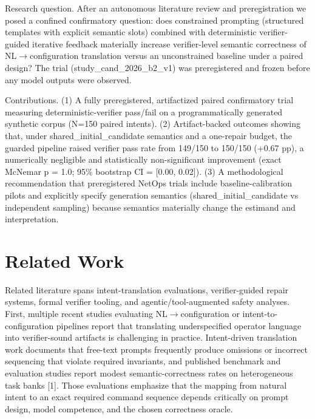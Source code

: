 \documentclass[conference]{IEEEtran}
\begin{document}
Research question. After an autonomous literature review and preregistration we posed a confined confirmatory question: does constrained prompting (structured templates with explicit semantic slots) combined with deterministic verifier-guided iterative feedback materially increase verifier-level semantic correctness of NL\ensuremath{\rightarrow}configuration translation versus an unconstrained baseline under a paired design? The trial (study\_cand\_2026\_b2\_v1) was preregistered and frozen before any model outputs were observed.

Contributions. (1) A fully preregistered, artifactized paired confirmatory trial measuring deterministic-verifier pass/fail on a programmatically generated synthetic corpus (N=150 paired intents). (2) Artifact-backed outcomes showing that, under shared\_initial\_candidate semantics and a one-repair budget, the guarded pipeline raised verifier pass rate from 149/150 to 150/150 (+0.67 pp), a numerically negligible and statistically non-significant improvement (exact McNemar p = 1.0; 95\% bootstrap CI = [0.00, 0.02]). (3) A methodological recommendation that preregistered NetOps trials include baseline-calibration pilots and explicitly specify generation semantics (shared\_initial\_candidate vs independent sampling) because semantics materially change the estimand and interpretation.

\section{Related Work}
Related literature spans intent-translation evaluations, verifier-guided repair systems, formal verifier tooling, and agentic/tool-augmented safety analyses. First, multiple recent studies evaluating NL\ensuremath{\rightarrow}configuration or intent-to-configuration pipelines report that translating underspecified operator language into verifier-sound artifacts is challenging in practice. Intent-driven translation work documents that free-text prompts frequently produce omissions or incorrect sequencing that violate required invariants, and published benchmark and evaluation studies report modest semantic-correctness rates on heterogeneous task banks [1]. Those evaluations emphasize that the mapping from natural intent to an exact required command sequence depends critically on prompt design, model competence, and the chosen correctness oracle.
\end{document}
